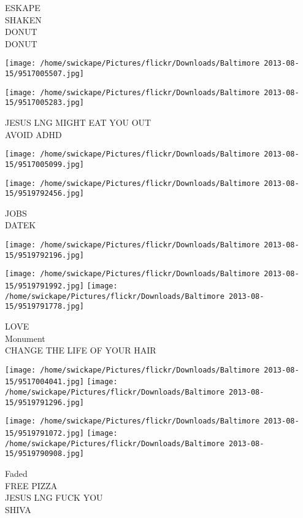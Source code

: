 \documentclass[10pt,letterpaper]{article}
\begin{document}
ESKAPE\\
SHAKEN\\
DONUT\\
DONUT\\
\pagebreak

\texttt{[image: /home/swickape/Pictures/flickr/Downloads/Baltimore 2013-08-15/9517005507.jpg]}

\vspace{0.25in}
\texttt{[image: /home/swickape/Pictures/flickr/Downloads/Baltimore 2013-08-15/9517005283.jpg]}

JESUS LNG MIGHT EAT YOU OUT\\
AVOID ADHD\\
\pagebreak

\texttt{[image: /home/swickape/Pictures/flickr/Downloads/Baltimore 2013-08-15/9517005099.jpg]}

\vspace{0.25in}
\texttt{[image: /home/swickape/Pictures/flickr/Downloads/Baltimore 2013-08-15/9519792456.jpg]}

JOBS\\
DATEK\\
\pagebreak

\texttt{[image: /home/swickape/Pictures/flickr/Downloads/Baltimore 2013-08-15/9519792196.jpg]}

\vspace{0.25in}
\texttt{[image: /home/swickape/Pictures/flickr/Downloads/Baltimore 2013-08-15/9519791992.jpg]}
\texttt{[image: /home/swickape/Pictures/flickr/Downloads/Baltimore 2013-08-15/9519791778.jpg]}

LOVE\\
Monument\\
CHANGE THE LIFE OF YOUR HAIR\\
\pagebreak

\texttt{[image: /home/swickape/Pictures/flickr/Downloads/Baltimore 2013-08-15/9517004041.jpg]}
\texttt{[image: /home/swickape/Pictures/flickr/Downloads/Baltimore 2013-08-15/9519791296.jpg]}

\texttt{[image: /home/swickape/Pictures/flickr/Downloads/Baltimore 2013-08-15/9519791072.jpg]}
\texttt{[image: /home/swickape/Pictures/flickr/Downloads/Baltimore 2013-08-15/9519790908.jpg]}

Faded\\
FREE PIZZA\\
JESUS LNG FUCK YOU\\
SHIVA\\
\pagebreak
\end{document}
